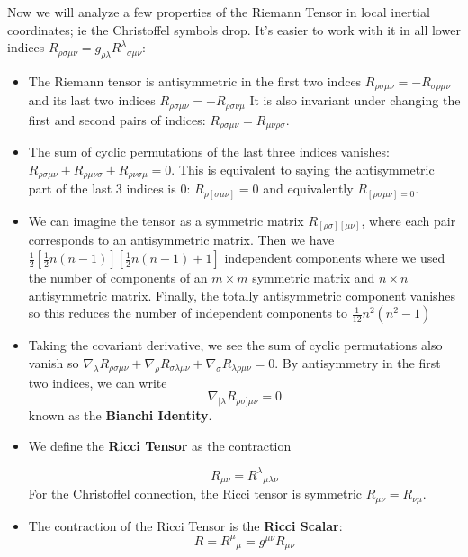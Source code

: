 \documentclass[11pt]{article}
\begin{document}
\noindent Now we will analyze a few properties of the Riemann Tensor in local inertial coordinates; ie the Christoffel symbols drop. It's easier to work with it in all lower indices \( R_{\rho \sigma \mu \nu} = g_{\rho\lambda}R^{\lambda}{}_{\sigma\mu\nu} \):
\begin{itemize}
    \item The Riemann tensor is antisymmetric in the first two indces \( R_{\rho\sigma\mu\nu} = -R_{\sigma\rho\mu\nu}  \) and its last two indices \( R_{\rho\sigma\mu\nu} = -R_{\rho\sigma\nu\mu}  \)
    It is also invariant under changing the first and second pairs of indices: \( R_{\rho \sigma \mu\nu} = R_{\mu \nu \rho \sigma} \).
    
    \item The sum of cyclic permutations of the last three indices vanishes: \( R_{\rho\sigma\mu\nu} + R_{\rho \mu\nu\sigma} + R_{\rho \nu \sigma\mu} = 0 \).
    This is equivalent to saying the antisymmetric part of the last 3 indices is 0: \( R_{\rho[\sigma\mu\nu]} = 0 \) and equivalently \( R_{[\rho\sigma\mu\nu] = 0} \).
    
    \item We can imagine the tensor as a symmetric matrix \( R_{[\rho\sigma][\mu\nu]} \), where each pair corresponds to an antisymmetric matrix. Then we have
    \( \frac{1}{2}[\frac{1}{2}n(n-1)][\frac{1}{2}n(n-1)+1] \) independent components where we used the number of components of an \( m \times m \) symmetric matrix and \( n \times n \) antisymmetric matrix. Finally, the totally antisymmetric component vanishes
    so this reduces the number of independent components to \( \frac{1}{12}n^{2}(n^{2}-1)  \)
    
    \item Taking the covariant derivative, we see the sum of cyclic permutations also vanish so \( \nabla_{\lambda}R_{\rho\sigma\mu\nu} + \nabla_{\rho}R_{\sigma\lambda\mu\nu} + \nabla_{\sigma}R_{\lambda\rho\mu\nu} = 0\). By antisymmetry in the first two indices, we can 
    write 
    \[ 
        \nabla_{[\lambda}R_{\rho\sigma]\mu\nu} = 0
    \]
    known as the \textbf{Bianchi Identity}.


    \item We define the \label{Ricci}\textbf{Ricci Tensor} as the contraction
    
    \[ 
        R_{\mu\nu} = R^{\lambda}{}_{\mu\lambda\nu} 
    \]
    For the Christoffel connection, the Ricci tensor is symmetric \( R_{\mu\nu} = R_{\nu\mu} \).
    
    \item The contraction of the Ricci Tensor is the \textbf{Ricci Scalar}:
    \[ 
        R = R^{\mu}{}_{\mu} = g^{\mu\nu}R_{\mu\nu} 
    \]
\end{itemize}
\end{document}
